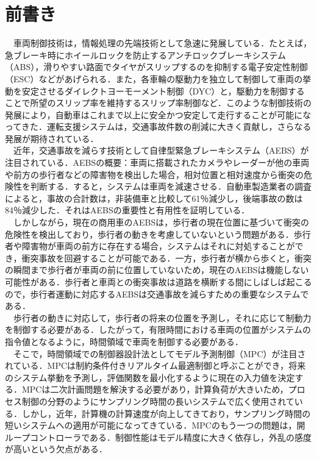 




\newpage


\newpage

\pagestyle{fancy}

\section{前書き}
　車両制御技術は，情報処理の先端技術として急速に発展している．たとえば，急ブレーキ時にホイールロックを防止するアンチロックブレーキシステム（ABS），滑りやすい路面でタイヤがスリップするのを抑制する電子安定性制御（ESC）などがあげられる．また，各車輪の駆動力を独立して制御して車両の挙動を安定させるダイレクトヨーモーメント制御（DYC）と，駆動力を制御することで所望のスリップ率を維持するスリップ率制御など．このような制御技術の発展により，自動車はこれまで以上に安全かつ安定して走行することが可能になってきた．運転支援システムは，交通事故件数の削減に大きく貢献し，さらなる発展が期待されている．\\
　近年，交通事故を減らす技術として自律型緊急ブレーキシステム（AEBS）が注目されている．AEBSの概要：車両に搭載されたカメラやレーダーが他の車両や前方の歩行者などの障害物を検出した場合，相対位置と相対速度から衝突の危険性を判断する．すると，システムは車両を減速させる．自動車製造業者の調査によると，事故の合計数は，非装備車と比較して61％減少し，後端事故の数は84％減少した．それはAEBSの重要性と有用性を証明している．\\
　しかしながら，現在の商用車のAEBSは，歩行者の現在位置に基づいて衝突の危険性を検出しており，歩行者の動きを考慮していないという問題がある．歩行者や障害物が車両の前方に存在する場合，システムはそれに対処することができ，衝突事故を回避することが可能である．一方，歩行者が横から歩くと，衝突の瞬間まで歩行者が車両の前に位置していないため，現在のAEBSは機能しない可能性がある．歩行者と車両との衝突事故は道路を横断する間にしばしば起こるので，歩行者運動に対応するAEBSは交通事故を減らすための重要なシステムである．\\
　歩行者の動きに対応して，歩行者の将来の位置を予測し，それに応じて制動力を制御する必要がある．したがって，有限時間における車両の位置がシステムの指令値となるように，時間領域で車両を制御する必要がある．\\
　そこで，時間領域での制御器設計法としてモデル予測制御（MPC）が注目されている．MPCは制約条件付きリアルタイム最適制御と呼ぶことができ，将来のシステム挙動を予測し，評価関数を最小化するように現在の入力値を決定する．MPCは二次計画問題を解決する必要があり，計算負荷が大きいため，プロセス制御の分野のようにサンプリング時間の長いシステムで広く使用されている．しかし，近年，計算機の計算速度が向上してきており，サンプリング時間の短いシステムへの適用が可能になってきている．MPCのもう一つの問題は，開ループコントローラである．制御性能はモデル精度に大きく依存し，外乱の感度が高いという欠点がある．\\
